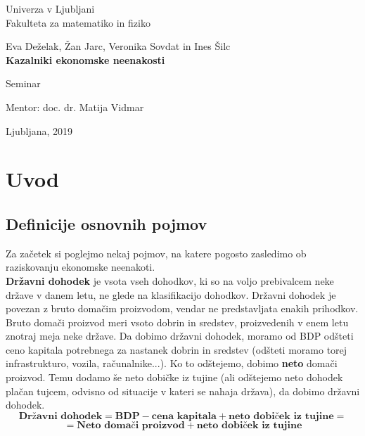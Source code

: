 \documentclass[a4paper,12 pt]{article}
\begin{document}
\begin{titlepage}
\begin{center}

\large
Univerza v Ljubljani\\
\normalsize
Fakulteta za matematiko in fiziko\\

\vspace{3 cm} 

\large
Eva Deželak, Žan Jarc, Veronika Sovdat in Ines Šilc\\

\vspace{0.5cm}
\LARGE
\textbf{Kazalniki ekonomske neenakosti}

\vspace{0.5 cm}
\normalsize
Seminar

\vspace{1.5cm}
\normalsize
Mentor: doc. dr. Matija Vidmar

\vspace{3cm}


\vfill

\large Ljubljana, 2019

\end{center}
\end{titlepage}

\newpage

\tableofcontents
\vspace{20mm}

\newpage

\section[Uvod]{Uvod}

\subsection[Definicije osnovnih pojmov]{Definicije osnovnih pojmov}
Za začetek si poglejmo nekaj pojmov, na katere pogosto zasledimo ob raziskovanju ekonomske neenakoti.
\\ 

\textbf{Državni dohodek} je vsota vseh dohodkov, ki so na voljo prebivalcem neke države v danem letu, ne glede na klasifikacijo dohodkov. Državni dohodek je povezan z bruto domačim proizvodom, vendar ne predstavljata enakih prihodkov. Bruto domači proizvod meri vsoto dobrin in sredstev, proizvedenih v enem letu znotraj meja neke države. Da dobimo državni dohodek, moramo od BDP odšteti ceno kapitala potrebnega za nastanek dobrin in sredstev (odšteti moramo torej infrastrukturo, vozila, računalnike...). Ko to odštejemo, dobimo \textbf{neto} domači proizvod. Temu dodamo še neto dobičke iz tujine (ali odštejemo neto dohodek plačan tujcem, odvisno od situacije v kateri se nahaja država), da dobimo državni dohodek.
$$
\textbf{Državni dohodek} = \textbf{BDP} - \textbf{cena kapitala} + \textbf{neto dobiček iz tujine}=
$$
$$
= \textbf{Neto domači proizvod} + \textbf{neto dobiček iz tujine}
$$
\end{document}
